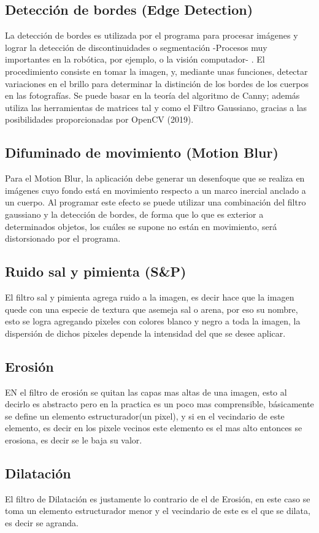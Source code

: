 \subsection{Detección de bordes (Edge Detection)}
	La detección de bordes es utilizada por el programa para procesar imágenes y lograr la detección de
	discontinuidades o segmentación -Procesos muy importantes en la robótica, por ejemplo, o la visión
	computador- \cite{Mathworks2}. El procedimiento consiste en tomar la imagen, y, mediante unas
	funciones, detectar variaciones en el brillo para determinar la distinción de los bordes de los cuerpos en
	las fotografías. Se puede basar en la teoría del algoritmo de Canny; además utiliza las herramientas de
	matrices tal y como el Filtro Gaussiano, gracias a las posibilidades proporcionadas por OpenCV (2019).
	
\subsection{Difuminado de movimiento (Motion Blur)}
	Para el Motion Blur, la aplicación debe generar un desenfoque que se realiza en imágenes cuyo fondo
	está en movimiento respecto a un marco inercial anclado a un cuerpo. Al programar este efecto se
	puede utilizar una combinación del filtro gaussiano y la detección de bordes, de forma que lo que es
	exterior a determinados objetos, los cuáles se supone no están en movimiento, será distorsionado por el
	programa.
\subsection{Ruido sal y pimienta (S\&P)}
	El filtro sal y pimienta agrega ruido a la imagen, es decir hace que la imagen quede con una especie de textura que asemeja sal o arena, por eso 
	su nombre, esto se logra agregando pixeles con colores blanco y negro a toda la imagen, la dispersión de dichos pixeles depende la intensidad del
	que se desee aplicar.
\subsection{Erosión}
	EN el filtro de erosión se quitan las capas mas altas de una imagen, esto al decirlo es abstracto pero en la practica es un poco mas comprensible,
	básicamente se define un elemento estructurador(un pixel), y si en el vecindario de este elemento, es decir en los pixele vecinos este elemento es
	el mas alto entonces se erosiona, es decir se le baja su valor.
\subsection{Dilatación}
	El filtro de Dilatación es justamente lo contrario de el de Erosión, en este caso se toma un elemento estructurador menor y el vecindario de este es el 
	que se dilata, es decir se agranda.
